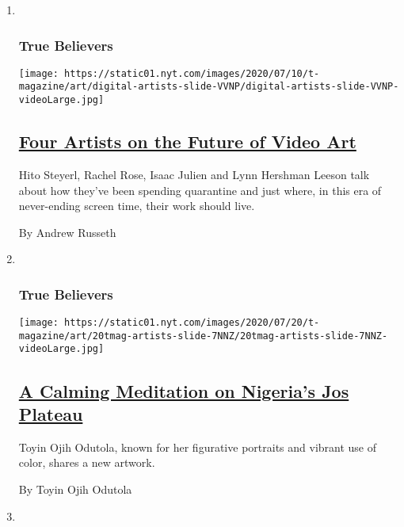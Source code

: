 \begin{enumerate}
\def\labelenumi{\arabic{enumi}.}
\item ~
  \hypertarget{true-believers-9}{%
  \subsubsection{True Believers}\label{true-believers-9}}

  \texttt{[image: https://static01.nyt.com/images/2020/07/10/t-magazine/art/digital-artists-slide-VVNP/digital-artists-slide-VVNP-videoLarge.jpg]}

  \hypertarget{four-artists-on-the-future-of-video-art}{%
  \subsection{\texorpdfstring{\href{/2020/07/22/t-magazine/video-art.html}{Four
  Artists on the Future of Video
  Art}}{Four Artists on the Future of Video Art}}\label{four-artists-on-the-future-of-video-art}}

  Hito Steyerl, Rachel Rose, Isaac Julien and Lynn Hershman Leeson talk
  about how they've been spending quarantine and just where, in this era
  of never-ending screen time, their work should live.

  By Andrew Russeth
\item ~
  \hypertarget{true-believers-10}{%
  \subsubsection{True Believers}\label{true-believers-10}}

  \texttt{[image: https://static01.nyt.com/images/2020/07/20/t-magazine/art/20tmag-artists-slide-7NNZ/20tmag-artists-slide-7NNZ-videoLarge.jpg]}

  \hypertarget{a-calming-meditation-on-nigerias-jos-plateau}{%
  \subsection{\texorpdfstring{\href{/2020/07/22/t-magazine/toyin-ojih-odutola.html}{A
  Calming Meditation on Nigeria's Jos
  Plateau}}{A Calming Meditation on Nigeria's Jos Plateau}}\label{a-calming-meditation-on-nigerias-jos-plateau}}

  Toyin Ojih Odutola, known for her figurative portraits and vibrant use
  of color, shares a new artwork.

  By Toyin Ojih Odutola
\item ~
  \hypertarget{true-believers-11}{%
}
\end{enumerate}
